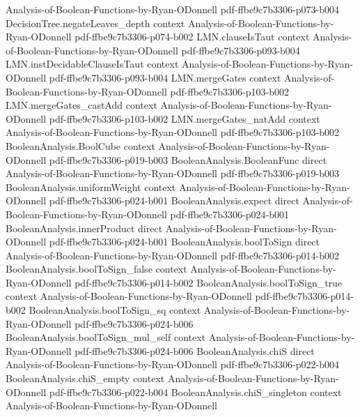 \begin{theorem}
  {Analysis-of-Boolean-Functions-by-Ryan-ODonnell}
  {pdf-ffbe9c7b3306-p073-b004}
\proofstep
  {DecisionTree.negateLeaves_depth}
  {context}
  {Analysis-of-Boolean-Functions-by-Ryan-ODonnell}
  {pdf-ffbe9c7b3306-p074-b002}
\proofstep
  {LMN.clauseIsTaut}
  {context}
  {Analysis-of-Boolean-Functions-by-Ryan-ODonnell}
  {pdf-ffbe9c7b3306-p093-b004}
\proofstep
  {LMN.instDecidableClauseIsTaut}
  {context}
  {Analysis-of-Boolean-Functions-by-Ryan-ODonnell}
  {pdf-ffbe9c7b3306-p093-b004}
\proofstep
  {LMN.mergeGates}
  {context}
  {Analysis-of-Boolean-Functions-by-Ryan-ODonnell}
  {pdf-ffbe9c7b3306-p103-b002}
\proofstep
  {LMN.mergeGates_castAdd}
  {context}
  {Analysis-of-Boolean-Functions-by-Ryan-ODonnell}
  {pdf-ffbe9c7b3306-p103-b002}
\proofstep
  {LMN.mergeGates_natAdd}
  {context}
  {Analysis-of-Boolean-Functions-by-Ryan-ODonnell}
  {pdf-ffbe9c7b3306-p103-b002}
\proofstep
  {BooleanAnalysis.BoolCube}
  {context}
  {Analysis-of-Boolean-Functions-by-Ryan-ODonnell}
  {pdf-ffbe9c7b3306-p019-b003}
\proofstep
  {BooleanAnalysis.BooleanFunc}
  {direct}
  {Analysis-of-Boolean-Functions-by-Ryan-ODonnell}
  {pdf-ffbe9c7b3306-p019-b003}
\proofstep
  {BooleanAnalysis.uniformWeight}
  {context}
  {Analysis-of-Boolean-Functions-by-Ryan-ODonnell}
  {pdf-ffbe9c7b3306-p024-b001}
\proofstep
  {BooleanAnalysis.expect}
  {direct}
  {Analysis-of-Boolean-Functions-by-Ryan-ODonnell}
  {pdf-ffbe9c7b3306-p024-b001}
\proofstep
  {BooleanAnalysis.innerProduct}
  {direct}
  {Analysis-of-Boolean-Functions-by-Ryan-ODonnell}
  {pdf-ffbe9c7b3306-p024-b001}
\proofstep
  {BooleanAnalysis.boolToSign}
  {direct}
  {Analysis-of-Boolean-Functions-by-Ryan-ODonnell}
  {pdf-ffbe9c7b3306-p014-b002}
\proofstep
  {BooleanAnalysis.boolToSign_false}
  {context}
  {Analysis-of-Boolean-Functions-by-Ryan-ODonnell}
  {pdf-ffbe9c7b3306-p014-b002}
\proofstep
  {BooleanAnalysis.boolToSign_true}
  {context}
  {Analysis-of-Boolean-Functions-by-Ryan-ODonnell}
  {pdf-ffbe9c7b3306-p014-b002}
\proofstep
  {BooleanAnalysis.boolToSign_sq}
  {context}
  {Analysis-of-Boolean-Functions-by-Ryan-ODonnell}
  {pdf-ffbe9c7b3306-p024-b006}
\proofstep
  {BooleanAnalysis.boolToSign_mul_self}
  {context}
  {Analysis-of-Boolean-Functions-by-Ryan-ODonnell}
  {pdf-ffbe9c7b3306-p024-b006}
\proofstep
  {BooleanAnalysis.chiS}
  {direct}
  {Analysis-of-Boolean-Functions-by-Ryan-ODonnell}
  {pdf-ffbe9c7b3306-p022-b004}
\proofstep
  {BooleanAnalysis.chiS_empty}
  {context}
  {Analysis-of-Boolean-Functions-by-Ryan-ODonnell}
  {pdf-ffbe9c7b3306-p022-b004}
\proofstep
  {BooleanAnalysis.chiS_singleton}
  {context}
  {Analysis-of-Boolean-Functions-by-Ryan-ODonnell}

\end{theorem}
